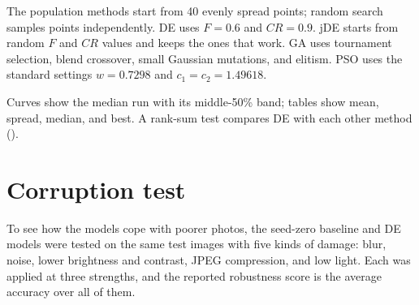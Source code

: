 The population methods start from 40 evenly spread points; random search samples points independently. DE uses $F=0.6$ and $CR=0.9$. jDE starts from random $F$ and $CR$ values and keeps the ones that work. GA uses tournament selection, blend crossover, small Gaussian mutations, and elitism. PSO uses the standard settings $w=0.7298$ and $c_1=c_2=1.49618$.

Curves show the median run with its middle-50\% band; tables show mean, spread, median, and best. A rank-sum test compares DE with each other method ().

\section{Corruption test}
To see how the models cope with poorer photos, the seed-zero baseline and DE models were tested on the same test images with five kinds of damage: blur, noise, lower brightness and contrast, JPEG compression, and low light. Each was applied at three strengths, and the reported robustness score is the average accuracy over all of them.
